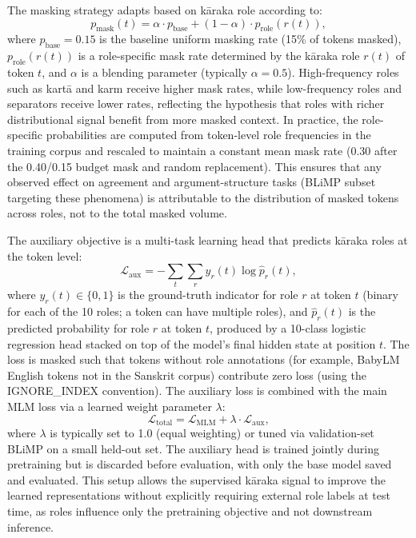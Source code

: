 The masking strategy adapts based on kāraka role according to:
\begin{equation}
  p_{\text{mask}}(t) = \alpha \cdot p_{\text{base}} + (1-\alpha) \cdot p_{\text{role}}(r(t)),
\end{equation}
where $p_{\text{base}} = 0.15$ is the baseline uniform masking rate (15\% of tokens masked), $p_{\text{role}}(r(t))$ is a role-specific mask rate determined by the kāraka role $r(t)$ of token $t$, and $\alpha$ is a blending parameter (typically $\alpha = 0.5$). High-frequency roles such as kartā and karm receive higher mask rates, while low-frequency roles and separators receive lower rates, reflecting the hypothesis that roles with richer distributional signal benefit from more masked context. In practice, the role-specific probabilities are computed from token-level role frequencies in the training corpus and rescaled to maintain a constant mean mask rate (0.30 after the 0.40/0.15 budget mask and random replacement). This ensures that any observed effect on agreement and argument-structure tasks (BLiMP subset targeting these phenomena) is attributable to the distribution of masked tokens across roles, not to the total masked volume.


The auxiliary objective is a multi-task learning head that predicts kāraka roles at the token level:
\begin{equation}
  \mathcal{L}_{\text{aux}} = -\sum_{t} \sum_{r} y_r(t) \log \hat{p}_r(t),
\end{equation}
where $y_r(t) \in \{0,1\}$ is the ground-truth indicator for role $r$ at token $t$ (binary for each of the 10 roles; a token can have multiple roles), and $\hat{p}_r(t)$ is the predicted probability for role $r$ at token $t$, produced by a 10-class logistic regression head stacked on top of the model's final hidden state at position $t$. The loss is masked such that tokens without role annotations (for example, BabyLM English tokens not in the Sanskrit corpus) contribute zero loss (using the IGNORE\_INDEX convention). The auxiliary loss is combined with the main MLM loss via a learned weight parameter $\lambda$:
\begin{equation}
  \mathcal{L}_{\text{total}} = \mathcal{L}_{\text{MLM}} + \lambda \cdot \mathcal{L}_{\text{aux}},
\end{equation}
where $\lambda$ is typically set to 1.0 (equal weighting) or tuned via validation-set BLiMP on a small held-out set. The auxiliary head is trained jointly during pretraining but is discarded before evaluation, with only the base model saved and evaluated. This setup allows the supervised kāraka signal to improve the learned representations without explicitly requiring external role labels at test time, as roles influence only the pretraining objective and not downstream inference.


